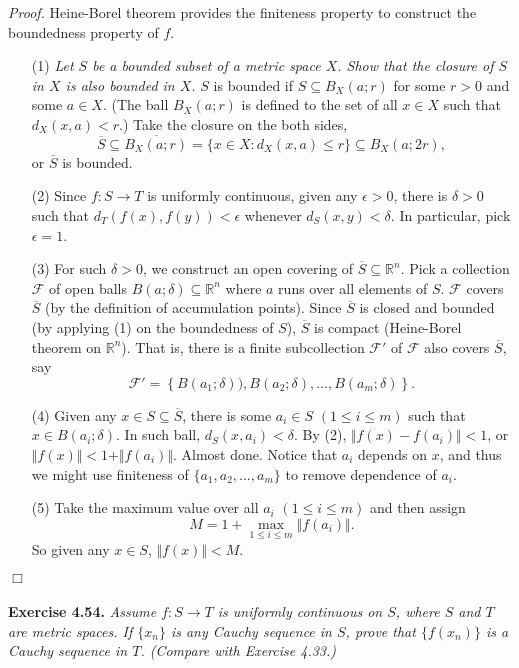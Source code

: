 \documentclass{article}
\begin{document}
\emph{Proof.}
Heine-Borel theorem provides the finiteness property to construct
the boundedness property of $f$.
\begin{enumerate}
\item[(1)]
\emph{Let $S$ be a bounded subset of a metric space $X$.
Show that the closure of $S$ in $X$ is also bounded in $X$.}
$S$ is bounded if $S \subseteq B_X(a;r)$ for some $r > 0$ and some $a \in X$.
(The ball $B_X(a;r)$ is defined to the set of all $x \in X$ such that
$d_X(x, a) < r$.)
Take the closure on the both sides,
$$\overline{S}
\subseteq \overline{B_X(a;r)}
= \{ x \in X : d_X(x, a) \leq r \}
\subseteq B_X(a;2r),$$
or $\overline{S}$ is bounded.
\item[(2)]
Since $f: S \rightarrow T$ is uniformly continuous,
given any $\epsilon > 0$, there is $\delta > 0$ such that
$d_T(f(x), f(y)) < \epsilon$ whenever $d_S(x, y) < \delta$.
In particular, pick $\epsilon = 1$.
\item[(3)]
For such $\delta > 0$, we construct an open covering of $\overline{S} \subseteq \mathbb{R}^n$.
Pick a collection $\mathscr{F}$ of open balls
$B(a;\delta) \subseteq \mathbb{R}^n$
where $a$ runs over all elements of $S$.
$\mathscr{F}$ covers $\overline{S}$ (by the definition of accumulation points).
Since $\overline{S} $ is closed and bounded (by applying (1) on the boundedness of $S$),
$\overline{S}$ is compact
(Heine-Borel theorem on $\mathbb{R}^n$).
That is, there is a finite subcollection $\mathscr{F}'$ of $\mathscr{F}$
also covers $\overline{S}$, say
$$\mathscr{F}'
= \left\{B(a_1;\delta)), B(a_2;\delta), ..., B(a_m;\delta) \right\}.$$
\item[(4)]
Given any $x \in S \subseteq \overline{S}$,
there is some $a_i \in S$ $(1 \leq i \leq m)$ such that $x \in B(a_i;\delta)$.
In such ball, $d_S(x, a_i) < \delta$.
By (2), $\Vert f(x) - f(a_i) \Vert < 1$,
or $\Vert f(x) \Vert < 1 + \Vert f(a_i) \Vert$.
Almost done.
Notice that $a_i$ depends on $x$,
and thus we might use finiteness of $\{ a_1, a_2, ..., a_m \}$
to remove dependence of $a_i$.
\item[(5)]
Take the maximum value over all $a_i$ $(1 \leq i \leq m)$ and then assign
$$M = 1 + \max_{1 \leq i \leq m}{\Vert f(a_i) \Vert}.$$
So given any $x \in S$, $\Vert f(x) \Vert < M$.
\end{enumerate}
$\Box$ \\\\



\textbf{Exercise 4.54.}
\emph{Assume $f: S \rightarrow T$ is uniformly continuous on $S$,
where $S$ and $T$ are metric spaces.
If $\{x_n\}$ is any Cauchy sequence in $S$,
prove that $\{f(x_n)\}$ is a Cauchy sequence in $T$.
(Compare with Exercise 4.33.)} \\
\end{document}
